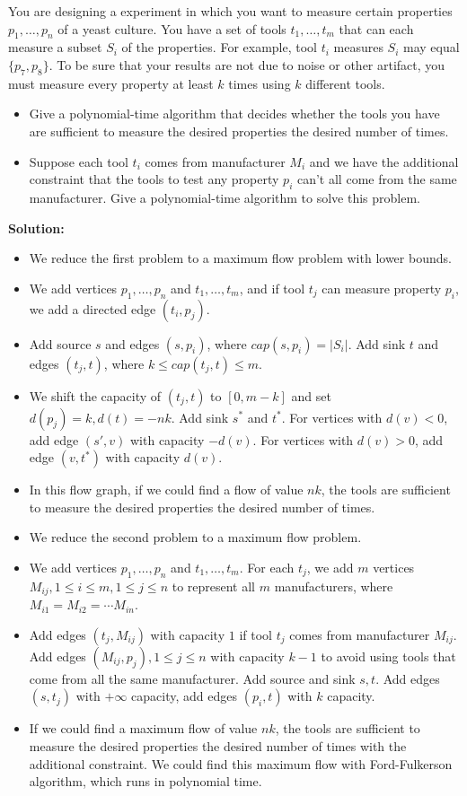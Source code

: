 \documentclass{article}
\newcounter{exercise}
\newcommand{\<}{
    \langle}
\renewcommand{\>}{
    \rangle}
\begin{document}
{\begin{exercise}
You are designing a experiment in which you want to measure certain properties $p_1,\ldots ,p_n$ of a yeast culture. You have a set of tools $t_1,\ldots ,t_m$ that can each measure a subset $S_i$ of the properties. For example, tool $t_i$ measures $S_i$ may equal $\{p_7,p_8\}$. To be sure that your results are not due to noise or other artifact, you must measure every property at least $k$ times using $k$ different tools.
\begin{itemize}
\item Give a polynomial-time algorithm that decides whether the tools you have are sufficient to measure the desired properties the desired number of times.
\item Suppose each tool $t_i$ comes from manufacturer $M_i$ and we have the additional constraint that the tools to test any property $p_i$ can't all come from the same manufacturer. Give a polynomial-time algorithm to solve this problem.
\end{itemize}
\end{exercise}
\textbf{Solution:}
\begin{itemize}
    \item We reduce the first problem to a maximum flow problem with lower bounds.
    \item We add vertices $p_1,\ldots ,p_n$ and $t_1,\ldots ,t_m$, and if tool $t_j$ can measure property $p_i$, we add a directed edge $(t_i,p_j)$.
    \item Add source $s$ and edges $(s,p_i)$, where $cap(s,p_i)=|S_i|$. Add sink $t$ and edges $(t_j,t)$, where $k\leq cap(t_j,t)\leq m$.
    \item We shift the capacity of $(t_j,t)$ to $[0,m-k]$ and set $d(p_j)=k,d(t)=-nk$. Add sink $s^*$ and $t^*$. For vertices with $d(v)<0$, add edge $(s',v)$ with capacity $-d(v)$. For vertices with $d(v)>0$, add edge $(v,t^*)$ with capacity $d(v)$.
    \item In this flow graph, if we could find a flow of value $nk$, the tools are sufficient to measure the desired properties the desired number of times.
    \newline
    \newline
    \item We reduce the second problem to a maximum flow problem.
    \item We add vertices $p_1,\ldots ,p_n$ and $t_1,\ldots ,t_m$. For each $t_j$, we add $m$ vertices $M_{ij},1\leq i\leq m,1\leq j\leq n$ to represent all $m$ manufacturers, where $M_{i1}=M_{i2}=\cdots M_{in}$.
    \item Add edges $(t_j, M_{ij})$ with capacity $1$ if tool $t_j$ comes from manufacturer $M_{ij}$. Add edges $(M_{ij}, p_j),1\leq j\leq n$ with capacity $k-1$ to avoid using tools that come from all the same manufacturer. Add source and sink $s,t$. Add edges $(s,t_j)$ with $+\infty$ capacity, add edges $(p_i,t)$ with $k$ capacity.
    \item If we could find a maximum flow of value $nk$, the tools are sufficient to measure the desired properties the desired number of times with the additional constraint. We could find this maximum flow with Ford-Fulkerson algorithm, which runs in polynomial time.


\end{itemize}}
\end{document}
